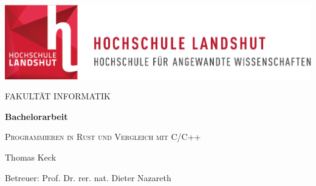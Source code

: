 
\thispagestyle{empty}


\begin{titlepage}

\vspace{3cm}

\begin{center}
    \includegraphics[scale=0.8]{Titelseite/hl-logo.pdf}  
\end{center}

\vspace{2.5cm}

\begin{center}
\Large FAKULTÄT INFORMATIK
\end{center}

\vspace{1cm}
\begin{center}
    \Huge
    \textbf{Bachelorarbeit}\\
\end{center}

\vspace{1cm}

\begin{center}
    \Large
    \textsc{Programmieren in Rust und Vergleich mit C/C++}\\
\end{center}

\vspace{1.5cm}

\begin{center}
    \Large
    Thomas Keck
\end{center}

\vspace{4cm}
\begin{center}
    \large
    Betreuer: Prof. Dr. rer. nat. Dieter Nazareth
\end{center}

\end{titlepage}
